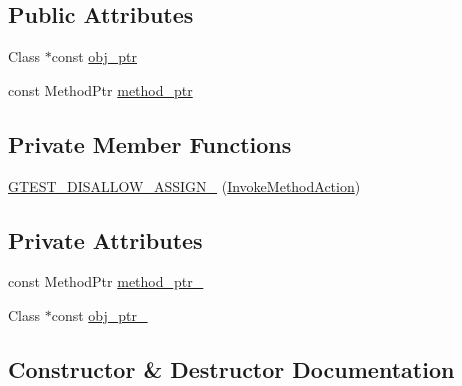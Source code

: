 \subsection*{Public Attributes}
\begin{DoxyCompactItemize}
\item 
Class $\ast$const \mbox{\hyperlink{structtesting_1_1internal_1_1_invoke_method_action_ae869b08a351641854e94380227affbc8}{obj\+\_\+ptr}}
\item 
const Method\+Ptr \mbox{\hyperlink{structtesting_1_1internal_1_1_invoke_method_action_a3101d543f56f7d010fac4d8eaa03acfb}{method\+\_\+ptr}}
\end{DoxyCompactItemize}
\subsection*{Private Member Functions}
\begin{DoxyCompactItemize}
\item 
\mbox{\hyperlink{structtesting_1_1internal_1_1_invoke_method_action_ade6d5b1ee276aedac65290465a447a87}{G\+T\+E\+S\+T\+\_\+\+D\+I\+S\+A\+L\+L\+O\+W\+\_\+\+A\+S\+S\+I\+G\+N\+\_\+}} (\mbox{\hyperlink{structtesting_1_1internal_1_1_invoke_method_action}{Invoke\+Method\+Action}})
\end{DoxyCompactItemize}
\subsection*{Private Attributes}
\begin{DoxyCompactItemize}
\item 
const Method\+Ptr \mbox{\hyperlink{structtesting_1_1internal_1_1_invoke_method_action_ad87861bde8960e57a429b3cf5ba70133}{method\+\_\+ptr\+\_\+}}
\item 
Class $\ast$const \mbox{\hyperlink{structtesting_1_1internal_1_1_invoke_method_action_ac857e8bad8f6417640145ab1f5740963}{obj\+\_\+ptr\+\_\+}}
\end{DoxyCompactItemize}


\subsection{Constructor \& Destructor Documentation}
\mbox{\label{structtesting_1_1internal_1_1_invoke_method_action_a16e545f6166e2d54eeafdc2ab3adf06b}} 
